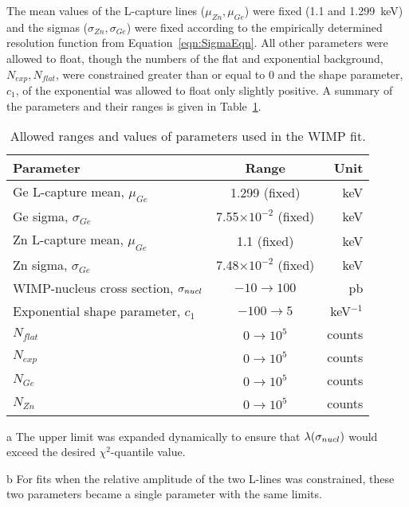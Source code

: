 The mean values of the L-capture lines ($\mu_{Zn}, \mu_{Ge}$) were fixed (1.1 and 1.299~keV) and the sigmas ($\sigma_{Zn}, \sigma_{Ge}$) were fixed according to the empirically determined resolution function from Equation~\ref{eqn:SigmaEqn}.  All other parameters were allowed to float, though the numbers of the flat and exponential background, $N_{exp}, N_{flat}$, were constrained greater than or equal to 0 and the shape parameter, $c_{1}$, of the exponential was allowed to float only slightly positive.  A summary of the parameters and their ranges is given in Table~\ref{tab:WIMPFitParameterRanges}. 
		\begin{table}
			\centering				
			\caption[Allowed ranges and values of parameters used in the WIMP fit]
			{Allowed ranges and values of parameters used in the WIMP fit.}
			\label{tab:WIMPFitParameterRanges}
			\smallskip
			\begin{threeparttable}
				\begin{tabular}{l c r }
				\toprule
				Parameter & Range & Unit \\
				\midrule
				Ge L-capture mean, $\mu_{Ge}$ & 1.299 (fixed) & keV \\
				Ge sigma, $\sigma_{Ge}$ & 7.55$\times10^{-2}$ (fixed) & keV \\				
				Zn L-capture mean, $\mu_{Ge}$ & 1.1 (fixed) & keV \\
				Zn sigma, $\sigma_{Ge}$ & 7.48$\times10^{-2}$ (fixed) & keV \\
				WIMP-nucleus cross section, $\sigma_{nucl}$ & $-10\to100$\tnote{a} & pb \\
				Exponential shape parameter, $c_{1}$ & $-100\to5$ & keV$^{-1}$ \\				
				$N_{flat}$ & $0\to10^{5}$ & counts \\			
				$N_{exp}$ & $0\to10^{5}$ & counts \\	
				$N_{Ge}$\tnote{b} & $0\to10^{5}$ & counts \\			
				$N_{Zn}$\tnote{b} & $0\to10^{5}$ & counts \\						
				\bottomrule
				\end{tabular}		
				 \begin{tablenotes}
				       \item[a] {The upper limit was expanded dynamically to ensure that $\lambda(\sigma_{nucl})$ would exceed
				       the desired $\chi^{2}$-quantile value.}
				       \item[b] { For fits when the relative amplitude of the two L-lines was constrained, these two 
				       parameters became a single parameter with the same limits.}
			     	\end{tablenotes}
			\end{threeparttable}
		\end{table}
